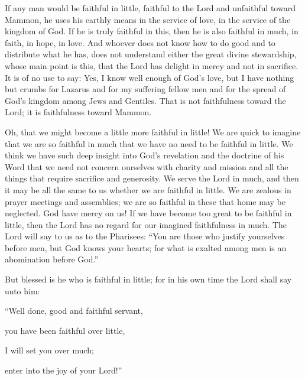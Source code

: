 If any man would be faithful in little, faithful to the Lord and unfaithful toward Mammon, he uses his earthly means in the service of love, in the service of the kingdom of God. If he is truly faithful in this, then he is also faithful in much, in faith, in hope, in love. And whoever does not know how to do good and to distribute what he has, does not understand either the great divine stewardship, whose main point is this, that the Lord has delight in mercy and not in sacrifice. It is of no use to say: Yes, I know well enough of God’s love, but I have nothing but crumbs for Lazarus and for my suffering fellow men and for the spread of God’s kingdom among Jews and Gentiles. That is not faithfulness toward the Lord; it is faithfulness toward Mammon.

Oh, that we might become a little more faithful in little! We are quick to imagine that we are so faithful in much that we have no need to be faithful in little. We think we have such deep insight into God’s revelation and the doctrine of his Word that we need not concern ourselves with charity and mission and all the things that require sacrifice and generosity. We serve the Lord in much, and then it may be all the same to us whether we are faithful in little. We are zealous in prayer meetings and assemblies; we are so faithful in these that home may be neglected. God have mercy on us! If we have become too great to be faithful in little, then the Lord has no regard for our imagined faithfulness in much. The Lord will say to us as to the Pharisees: “You are those who justify yourselves before men, but God knows your hearts; for what is exalted among men is an abomination before God.”

But blessed is he who is faithful in little; for in his own time the Lord shall say unto him: 

“Well done, good and faithful servant, 

you have been faithful over little, 

I will set you over much; 

enter into the joy of your Lord!”


